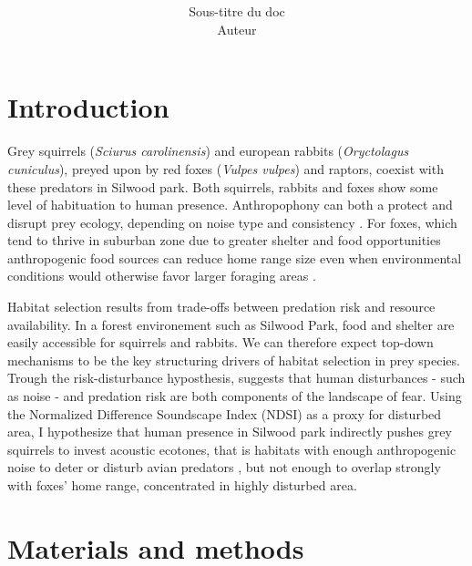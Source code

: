 \documentclass{article}
\title{\sffamily\LARGE\bfseries }
\author{\sffamily Sous-titre du doc\\Auteur}
\date{}
\begin{document}
\maketitle




\section{Introduction}\label{sec:intro}
Grey squirrels (\textit{Sciurus carolinensis}) and european rabbits (\textit{Oryctolagus cuniculus}), preyed upon by red foxes (\textit{Vulpes vulpes}) and raptors, coexist with these predators in Silwood park. Both squirrels, rabbits and foxes show some level of habituation to human presence. Anthropophony can both a protect and disrupt prey ecology, depending on noise type and consistency \citep{Thompson2024,Planillo2013}. For foxes, which tend to thrive in suburban zone due to greater shelter and food opportunities \cite{Scott2014} anthropogenic food sources can reduce home range size even when environmental conditions would otherwise favor larger foraging areas \citep{Main2020}.

Habitat selection results from trade-offs between predation risk and resource availability. In a forest environement such as Silwood Park, food and shelter are easily accessible for squirrels and rabbits. We can therefore expect top-down mechanisms to be the key structuring drivers of habitat selection in prey species. Trough the risk-disturbance hyposthesis, \cite{Frid2002} suggests that human disturbances - such as noise - and predation risk are both components of the landscape of fear. Using the Normalized Difference Soundscape Index (NDSI) as a proxy for disturbed area, I hypothesize that human presence in Silwood park indirectly pushes grey squirrels to invest acoustic ecotones, that is habitats with enough anthropogenic noise to deter or disturb avian predators \citep{Krijnen2025}, but not enough to overlap strongly with foxes' home range, concentrated in highly disturbed area.

\section{Materials and methods}
\end{document}
